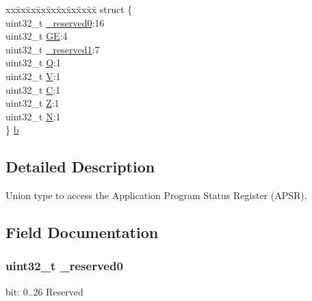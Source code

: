 \begin{DoxyCompactItemize}
\begin{tabbing}
\end{tabbing}\item 
\begin{tabbing}
xx\=xx\=xx\=xx\=xx\=xx\=xx\=xx\=xx\=\kill
struct \{\\
\>uint32\_t \hyperlink{union_a_p_s_r___type_ac8a6a13838a897c8d0b8bc991bbaf7c1}{\_reserved0}:16\\
\>uint32\_t \hyperlink{union_a_p_s_r___type_aa91800ec6e90e457c7a1acd1f2e17099}{GE}:4\\
\>uint32\_t \hyperlink{union_a_p_s_r___type_a959a73d8faee56599b7e792a7c5a2d16}{\_reserved1}:7\\
\>uint32\_t \hyperlink{union_a_p_s_r___type_a65f27ddc4f7e09c14ce7c5211b2e000a}{Q}:1\\
\>uint32\_t \hyperlink{union_a_p_s_r___type_acd4a2b64faee91e4a9eef300667fa222}{V}:1\\
\>uint32\_t \hyperlink{union_a_p_s_r___type_a7a1caf92f32fe9ebd8d1fe89b06c7776}{C}:1\\
\>uint32\_t \hyperlink{union_a_p_s_r___type_a5ae954cbd9986cd64625d7fa00943c8e}{Z}:1\\
\>uint32\_t \hyperlink{union_a_p_s_r___type_abae0610bc2a97bbf7f689e953e0b451f}{N}:1\\
\} \hyperlink{union_a_p_s_r___type_a1611cae6e74a7581fbca5c223e7290c9}{b}\\

\end{tabbing}\end{DoxyCompactItemize}


\subsection{Detailed Description}
Union type to access the Application Program Status Register (A\-P\-S\-R). 

\subsection{Field Documentation}
\hypertarget{union_a_p_s_r___type_ac8a6a13838a897c8d0b8bc991bbaf7c1}{
\subsubsection[{\-\_\-reserved0}]{\setlength{\rightskip}{0pt plus 5cm}uint32\-\_\-t \-\_\-reserved0}}\label{union_a_p_s_r___type_ac8a6a13838a897c8d0b8bc991bbaf7c1}
bit\-: 0..26 Reserved

